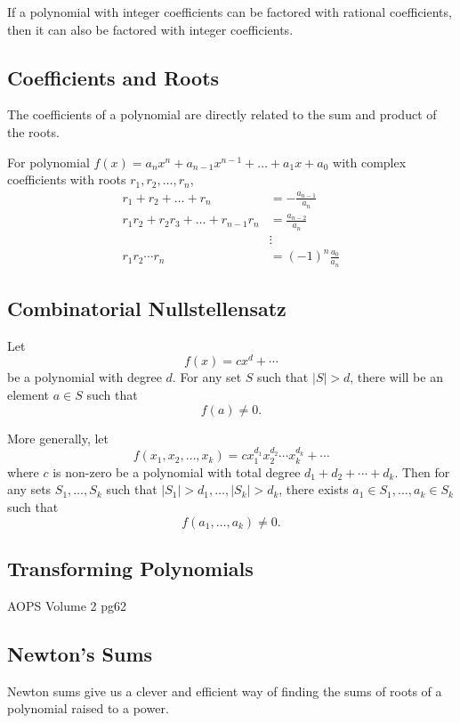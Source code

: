 \begin{theorem}
If a polynomial with integer coefficients can be factored with rational coefficients, then it can also be factored with integer coefficients.
\end{theorem}

\subsection{Coefficients and Roots}
The coefficients of a polynomial are directly related to the sum and product of the roots.

\begin{theorem}
For polynomial $f(x)=a_n x^n+a_{n-1} x^{n-1}+\dots+a_1 x+a_0$ with complex coefficients with roots $r_1, r_2, \dots, r_n$, 
\begin{equation}
\begin{split}
r_1+r_2+\dots+r_n &= -\frac{a_{n-1}}{a_n} \\
r_1 r_2+r_2 r_3+\dots+r_{n-1} r_n &= \frac{a_{n-2}}{a_n} \\
&\vdots \\
r_1 r_2 \cdots r_n &= (-1)^n \frac{a_0}{a_n}
\end{split}
\end{equation}
\end{theorem}

\subsection{Combinatorial Nullstellensatz}
Let 
\[ f(x)=cx^d+\cdots \]
be a polynomial with degree $d$. For any set $S$ such that $|S|>d$, there will be an element $a\in S$ such that
\[ f(a)\neq0. \]

More generally, let
\[ f(x_1,x_2,\dots,x_k)=cx_1^{d_1}x_2^{d_2}\cdots x_k^{d_k}+\cdots \]
where $c$ is non-zero be a polynomial with total degree $d_1+d_2+\cdots+d_k$. Then for any sets $S_1,\dots,S_k$ such that $|S_1|>d_1, \dots, |S_k|>d_k$, there exists $a_1\in S_1, \dots, a_k\in S_k$ such that
\[ f(a_1,\dots,a_k)\neq0. \]

\subsection{Transforming Polynomials}
AOPS Volume 2 pg62

\subsection{Newton's Sums}
Newton sums give us a clever and efficient way of finding the sums of roots of a polynomial raised to a power.

